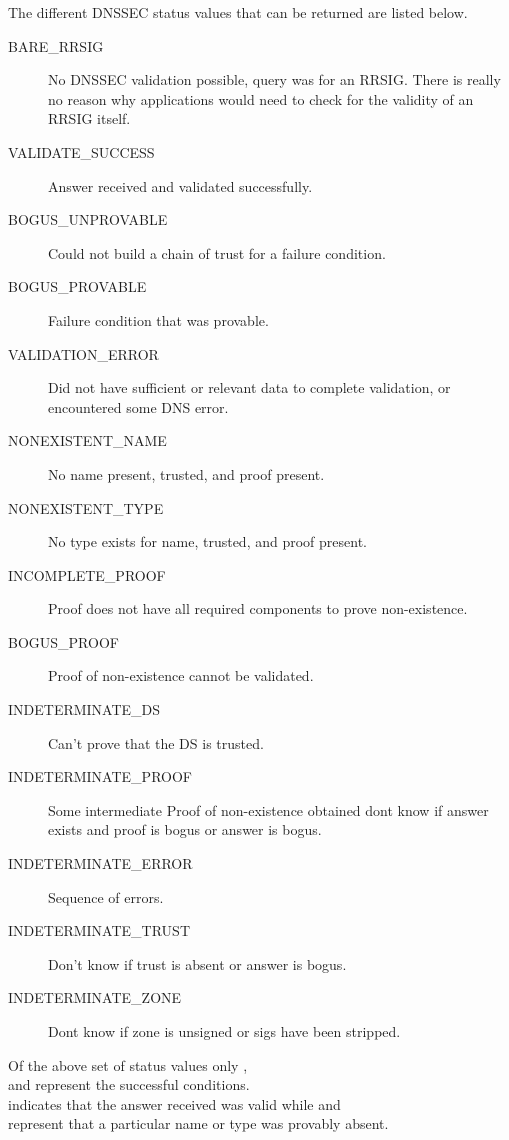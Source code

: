                                                                                                                              
The different DNSSEC status values that can be returned are listed below.

\begin{description}
\item[BARE\_RRSIG] No DNSSEC validation possible, query was for an RRSIG.
			 There is really no reason why applications would need to 
			 check for the validity of an RRSIG itself.
\item[VALIDATE\_SUCCESS] Answer received and validated successfully. 
\item[BOGUS\_UNPROVABLE] Could not build a chain of trust for a failure condition. 
\item[BOGUS\_PROVABLE] Failure condition that was provable. 
\item[VALIDATION\_ERROR] Did not have sufficient or relevant data to complete 
				  validation, or encountered some DNS error. 
\item[NONEXISTENT\_NAME] No name present, trusted, and proof present. 
\item[NONEXISTENT\_TYPE] No type exists for name, trusted, and proof present. 
\item[INCOMPLETE\_PROOF] Proof does not have all required components to prove 
				  non-existence. 
\item[BOGUS\_PROOF] Proof of non-existence cannot be validated. 
\item[INDETERMINATE\_DS] Can't prove that the DS is trusted. 
\item[INDETERMINATE\_PROOF]  Some intermediate Proof of non-existence obtained 
					 dont know if answer exists and proof is bogus 
					 or answer is bogus. 
\item[INDETERMINATE\_ERROR] Sequence of errors.
\item[INDETERMINATE\_TRUST] Don't know if trust is absent or answer is bogus. 
\item[INDETERMINATE\_ZONE]  Dont know if zone is unsigned or sigs have been stripped. 
\end{description}


Of the above set of status values only ,  \\
and  represent the successful conditions.  \\
indicates that the answer received was valid while  and \\
 represent that a particular name or type was provably absent.
                                                                                                                             
